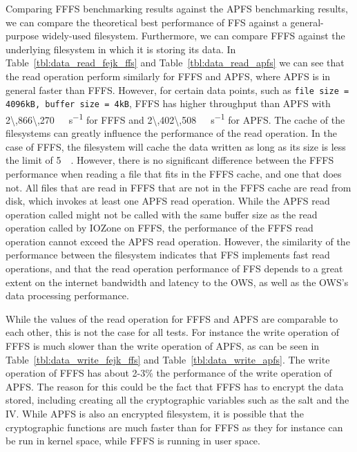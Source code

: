Comparing \gls{FFFS} benchmarking results against the \gls{APFS} benchmarking results, we can compare the theoretical best performance of \gls{FFS} against a \mbox{general-purpose} \mbox{widely-used} filesystem. Furthermore, we can compare \gls{FFFS} against the underlying filesystem in which it is storing its data. In Table~\ref{tbl:data_read_fejk_ffs} and Table~\ref{tbl:data_read_apfs} we can see that the read operation perform similarly for \gls{FFFS} and \gls{APFS}, where \gls{APFS} is in general faster than \gls{FFFS}. However, for certain data points, such as \texttt{file size = 4096kB, buffer size = 4kB}, \gls{FFFS} has higher throughput than \gls{APFS} with \SI[per-mode = symbol]{2\,866\,270}{\kilo\byte\per\second} for \gls{FFFS} and \SI[per-mode = symbol]{2\,402\,508}{\kilo\byte\per\second} for \gls{APFS}. The cache of the filesystems can greatly influence the performance of the read operation. In the case of \gls{FFFS}, the filesystem will cache the data written as long as its size is less the limit of \SI{5}{\mega\byte}. However, there is no significant difference between the \gls{FFFS} performance when reading a file that fits in the \gls{FFFS} cache, and one that does not. All files that are read in \gls{FFFS} that are not in the \gls{FFFS} cache are read from disk, which invokes at least one \gls{APFS} read operation. While the \gls{APFS} read operation called might not be called with the same buffer size as the read operation called by IOZone on \gls{FFFS}, the performance of the \gls{FFFS} read operation cannot exceed the \gls{APFS} read operation. However, the similarity of the performance between the filesystem indicates that \gls{FFS} implements fast read operations, and that the read operation performance of \gls{FFS} depends to a great extent on the internet bandwidth and latency to the \gls{OWS}, as well as the \gls{OWS}'s data processing performance.

While the values of the read operation for \gls{FFFS} and \gls{APFS} are comparable to each other, this is not the case for all tests. For instance the write operation of \gls{FFFS} is much slower than the write operation of \gls{APFS}, as can be seen in Table~\ref{tbl:data_write_fejk_ffs} and Table~\ref{tbl:data_write_apfs}. The write operation of \gls{FFFS} has about \mbox{2-3}\% the performance of the write operation of \gls{APFS}. The reason for this could be the fact that \gls{FFFS} has to encrypt the data stored, including creating all the cryptographic variables such as the salt and the \gls{IV}. While \gls{APFS} is also an encrypted filesystem, it is possible that the cryptographic functions are much faster than for \gls{FFFS} as they for instance can be run in kernel space, while \gls{FFFS} is running in user space.

